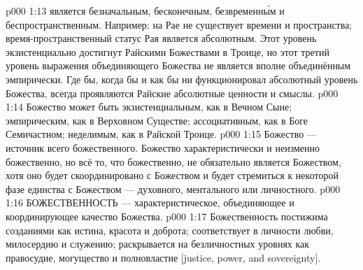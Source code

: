 \vs p000 1:13 \pc {} является безначальным, бесконечным, безвременн\'ым и беспространственным. Например: на Рае не существует времени и пространства; время\hyp{}пространственный статус Рая является абсолютным. Этот уровень экзистенциально достигнут Райскими Божествами в Троице, но этот третий уровень выражения объединяющего Божества не является вполне объединённым эмпирически. Где бы, когда бы и как бы ни функционировал абсолютный уровень Божества, всегда проявляются Райские абсолютные ценности и смыслы.
\vs p000 1:14 \pc Божество может быть экзистенциальным, как в Вечном Сыне; эмпирическим, как в Верховном Существе; ассоциативным, как в Боге Семичастном; неделимым, как в Райской Троице.
\vs p000 1:15 Божество --- источник всего божественного. Божество характеристически и неизменно божественно, но всё то, что божественно, не обязательно является Божеством, хотя оно будет скоординировано с Божеством и будет стремиться к некоторой фазе единства с Божеством --- духовного, ментального или личностного.
\vs p000 1:16 \pc БОЖЕСТВЕННОСТЬ --- характеристическое, объединяющее и координирующее качество Божества.
\vs p000 1:17 Божественность постижима созданиями как истина, красота и доброта; соответствует в личности любви, милосердию и служению; раскрывается на безличностных уровнях как правосудие, могущество и полновластие [justice, power, and sovereignty].
